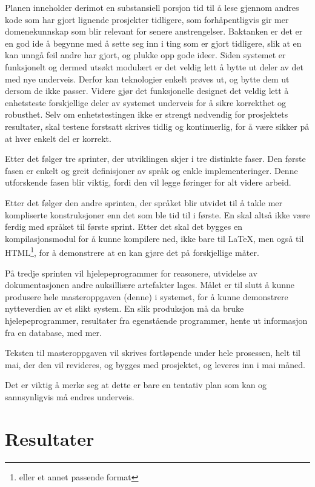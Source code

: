 \documentclass[11pt]{article}
\begin{document}
Planen inneholder derimot en substansiell porsjon tid til å lese gjennom andres kode som har gjort lignende prosjekter tidligere, som forhåpentligvis gir mer domenekunnskap som blir relevant for senere anstrengelser.
Baktanken er det er en god ide å begynne med å sette seg inn i ting som er gjort tidligere, slik at en kan unngå feil andre har gjort, og plukke opp gode ideer.
Siden systemet er funksjonelt og dermed utsøkt modulært er det veldig lett å bytte ut deler av det med nye underveis. Derfor kan teknologier enkelt prøves ut, og bytte dem ut dersom de ikke passer.
Videre gjør det funksjonelle designet det veldig lett å enhetsteste forskjellige deler av systemet underveis for å sikre korrekthet og robusthet.
Selv om enhetstestingen ikke er strengt nødvendig for prosjektets resultater, skal testene forstsatt skrives tidlig og kontinuerlig, for å være sikker på at hver enkelt del er korrekt.

Etter det følger tre sprinter, der utviklingen skjer i tre distinkte faser.
Den første fasen er enkelt og greit definisjoner av språk og enkle implementeringer.
Denne utforskende fasen blir viktig, fordi den vil legge føringer for alt videre arbeid.

Etter det følger den andre sprinten, der språket blir utvidet til å takle mer kompliserte konstruksjoner enn det som ble tid til i første.
En skal altså ikke være ferdig med språket til første sprint. Etter det skal det bygges en kompilasjonsmodul for å kunne kompilere ned, ikke bare til \LaTeX, men også til HTML\footnote{eller et annet passende format}, for å demonstrere at en kan gjøre det på forskjellige måter.

På tredje sprinten vil hjelepeprogrammer for reasonere, utvidelse av dokumentasjonen andre auksilliære artefakter lages. Målet er til slutt å kunne produsere hele masteroppgaven (denne) i systemet, for å kunne demonstrere nytteverdien av et slikt system.
En slik produksjon må da bruke hjelepeprogrammer, resultater fra egenstående programmer, hente ut informasjon fra en database, med mer.

Teksten til masteroppgaven vil skrives fortløpende under hele prosessen, helt til mai, der den vil revideres, og bygges med prosjektet, og leveres inn i mai måned.

Det er viktig å merke seg at dette er bare en tentativ plan som kan og sannsynligvis må endres underveis.


\section{Resultater}
\label{sec:resultater}
\end{document}
